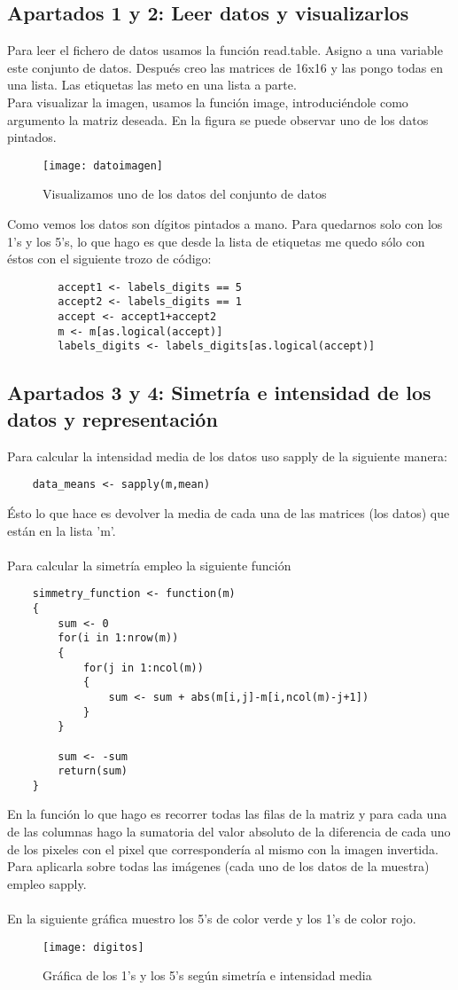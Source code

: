 	\subsection{Apartados 1 y 2: Leer datos y visualizarlos}
	Para leer el fichero de datos usamos la función read.table. Asigno a una variable este conjunto de datos. Después creo las matrices de 16x16 y las pongo todas en una lista. Las etiquetas las meto en una lista a parte.
	\\
	Para visualizar la imagen, usamos la función image, introduciéndole como argumento la matriz deseada. En la figura se puede observar uno de los datos pintados.
	\begin{figure} [H]
	\centering
	\texttt{[image: datoimagen]}
	\caption{Visualizamos uno de los datos del conjunto de datos}
	\label{fig:datoimagen}
	\end{figure}
	
	Como vemos los datos son dígitos pintados a mano. Para quedarnos solo con los 1's y los 5's, lo que hago es que desde la lista de etiquetas me quedo sólo con éstos con el siguiente trozo de código:
	\begin{lstlisting}
		accept1 <- labels_digits == 5
		accept2 <- labels_digits == 1
		accept <- accept1+accept2
		m <- m[as.logical(accept)]
		labels_digits <- labels_digits[as.logical(accept)]
	\end{lstlisting}


	\subsection{Apartados 3 y 4: Simetría e intensidad de los datos y representación}
	Para calcular la intensidad media de los datos uso sapply de la siguiente manera:
	\begin{lstlisting}
	data_means <- sapply(m,mean)
	\end{lstlisting}
	Ésto lo que hace es devolver la media de cada una de las matrices (los datos) que están en la lista 'm'.
	\\
	\\
	Para calcular la simetría empleo la siguiente función
	\begin{lstlisting}
	simmetry_function <- function(m)
	{
		sum <- 0
		for(i in 1:nrow(m))
		{
			for(j in 1:ncol(m))
			{
				sum <- sum + abs(m[i,j]-m[i,ncol(m)-j+1])
			}
		}
		
		sum <- -sum
		return(sum)
	}
	\end{lstlisting}
	En la función lo que hago es recorrer todas las filas de la matriz y para cada una de las columnas hago la sumatoria del valor absoluto de la diferencia de cada uno de los pixeles con el pixel que correspondería al mismo con la imagen invertida. Para aplicarla sobre todas las imágenes (cada uno de los datos de la muestra) empleo sapply.
	\\
	\\
	\newpage
	En la siguiente gráfica muestro los 5's de color verde y los 1's de color rojo.
	\begin{figure} [H]
	\centering
	\texttt{[image: digitos]}
	\caption{Gráfica de los 1's y los 5's según simetría e intensidad media}
	\label{fig:digitos}
	\end{figure}

